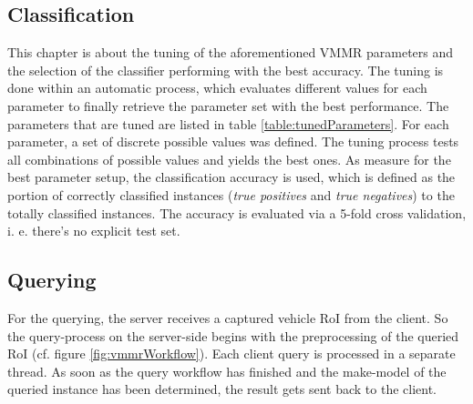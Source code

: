 \subsection{Classification}\label{sec:classificationImpl}
This chapter is about the tuning of the aforementioned VMMR parameters and the selection of the classifier performing with the best accuracy. The tuning is done within an automatic process, which evaluates different values for each parameter to finally retrieve the parameter set with the best performance. The parameters that are tuned are listed in table \ref{table:tunedParameters}. For each parameter, a set of discrete possible values was defined. The tuning process tests all combinations of possible values and yields the best ones. As measure for the best parameter setup, the classification accuracy is used, which is defined as the portion of correctly classified instances (\emph{true positives} and \emph{true negatives}) to the totally classified instances. The accuracy is evaluated via a 5-fold cross validation, i. e. there's no explicit test set.

\subsection{Querying}
For the querying, the server receives a captured vehicle RoI from the client. So the query-process on the server-side begins with the preprocessing of the queried RoI (cf. figure \ref{fig:vmmrWorkflow}). Each client query is processed in a separate thread. As soon as the query workflow has finished and the make-model of the queried instance has been determined, the result gets sent back to the client.

